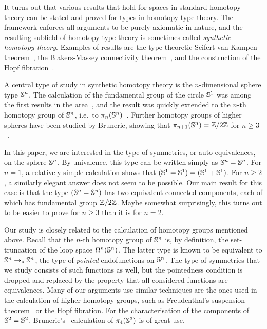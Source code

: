 \documentclass[english,a4paper]{lmcs}
\begin{document}
It turns out that various results that hold for spaces in standard homotopy theory can be stated and proved for types in homotopy type theory.
The framework enforces all arguments to be purely axiomatic in nature, and the resulting subfield of homotopy type theory is sometimes called \emph{synthetic homotopy theory}.
Examples of results are the type-theoretic Seifert-van Kampen theorem~\cite{houfavonia_et_al:LIPIcs:2016:6562}, the Blakers-Massey connectivity theorem~\cite{favonia_blakers}, and the construction of the Hopf fibration~\cite[Chp.~8.5]{HoTT}.

A central type of study in synthetic homotopy theory is the $n$-dimensional sphere type ${\mathbb S^{n}}$.
The calculation of the fundamental group of the circle ${\mathbb S^{1}}$ was among the first results in the area~\cite{licataShulman_circle}, and the result was quickly extended to the $n$-th homotopy group of ${\mathbb S^{n}}$, i.e.\ to $\pi_n({\mathbb S^{n}})$~\cite{licataBrunerie_s1again}.
Further homotopy groups of higher spheres have been studied by Brunerie, showing that $\pi_{n+1}({\mathbb S^{n}}) = \mathbb{Z}/2 \mathbb{Z}$ for $n \geq 3$~\cite{brunerie:thesis}.

In this paper, we are interested in the type of symmetries, or auto-equivalences, on the sphere ${\mathbb S^{n}}$.
By univalence, this type can be written simply as ${\mathbb S^{n}} = {\mathbb S^{n}}$.
For $n = 1$, a relatively simple calculation shows that $({\mathbb S^{1}} = {\mathbb S^{1}}) = ({\mathbb S^{1}} + {\mathbb S^{1}})$.
For $n \geq 2$, a similarly elegant answer does not seem to be possible.
Our main result for this case is that the type $({\mathbb S^{n}} = {\mathbb S^{n}})$ has two equivalent connected components, each of which has fundamental group $\mathbb{Z} / 2 \mathbb{Z}$.
Maybe somewhat surprisingly, this turns out to be easier to prove for $n \geq 3$ than it is for $n = 2$.

Our study is closely related to the calculation of homotopy groups mentioned above.
Recall that the $n$-th homotopy group of ${\mathbb S^{n}}$ is, by definition, the set-truncation of the loop space $\Omega^n({\mathbb S^{n}})$.
The latter type is known to be equivalent to ${\mathbb S^{n}} \to_\ast {\mathbb S^{n}}$, the type of \emph{pointed} endofunctions on ${\mathbb S^{n}}$.
The type of symmetries that we study consists of such functions as well, but the pointedness condition is dropped and replaced by the property that all considered functions are equivalences.
Many of our arguments use similar techniques are the ones used in the calculation of higher homotopy groups, such as Freudenthal's suspension theorem~\cite[Thm 8.6.4]{HoTT} or the Hopf fibration.
For the characterisation of the components of ${\mathbb S^{2}} = {\mathbb S^{2}}$, Brunerie's~\cite{brunerie:thesis} calculation of $\pi_4({\mathbb S^{3}})$ is of great use.
\end{document}

